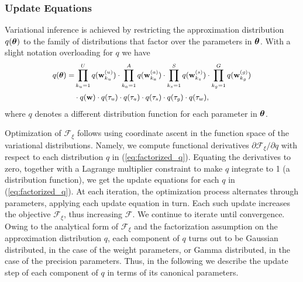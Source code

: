 \subsubsection{Update Equations}
Variational inference is achieved by restricting the approximation distribution $q(\bm{\theta})$ to
the family of distributions that factor over the parameters in $\bm{\theta}$. With a slight notation overloading for $q$ we have  
\begin{equation}
\begingroup\makeatletter\def\f@size{\fsize}\check@mathfonts
\def\maketag@@@#1{\hbox{\m@th\large\normalfont#1}}%
\begin{aligned}
q(\btheta)= & \prod_{k_u=1}^U q(\w_{k_u}^{(u)}) \cdot \prod_{k_a=1}^A q(\w_{k_a}^{(a)}) \cdot \prod_{k_s=1}^S q(\w_{k_s}^{(s)}) \cdot \prod_{k_g=1}^G q(\w_{k_g}^{(g)}) \\
& \cdot q(\w) \cdot q(\tau_u) \cdot q(\tau_a) \cdot q(\tau_s) \cdot q(\tau_g) \cdot q(\tau_w), 
\label{eq:factorized_q}
\end{aligned}\endgroup
\end{equation} 
where $q$ denotes a different distribution function for each parameter in $\bm{\theta}$.

Optimization of $\mathcal{F}_{\xi}$ follows using coordinate ascent in the function space of the variational distributions. 
Namely, we compute functional derivatives $\partial\mathcal{F}_{\xi} / \partial q $ with respect to each
distribution $q$ in (\ref{eq:factorized_q}). 
Equating the derivatives to zero, together with a Lagrange multiplier constraint to make $q$ integrate
to 1 (a distribution function), we get the update equations for each $q$ in (\ref{eq:factorized_q}). At each iteration, the optimization process alternates through parameters, applying each update equation in turn. 
Each such update increases the objective $\mathcal{F}_{\xi}$, thus increasing $\mathcal{F}$. We continue to iterate until convergence.
Owing to the analytical form of $\mathcal{F}_{\xi}$ and the factorization assumption on the approximation distribution $q$, each component of $q$ turns out to be Gaussian distributed, in the case of the weight parameters, or Gamma distributed, in the case of the precision parameters.
Thus, in the following we describe the update step of each component of $q$ in terms of its canonical parameters.


